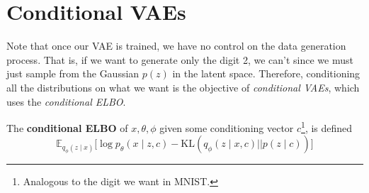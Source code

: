\section{Conditional VAEs}

  Note that once our VAE is trained, we have no control on the data generation process. That is, if we want to generate only the digit 2, we can't since we must just sample from the Gaussian $p(z)$ in the latent space. Therefore, conditioning all the distributions on what we want is the objective of \textit{conditional VAEs}, which uses the \textit{conditional ELBO}. 

  \begin{definition}
    \label{def:conditional-elbo}
    The \textbf{conditional ELBO} of $x, \theta, \phi$ given some conditioning vector $c$\footnote{Analogous to the digit we want in MNIST.}, is defined 
    \begin{equation}
      \mathbb{E}_{q_\phi(z \mid x)} \big[ \log p_\theta(x \mid z,c) - \mathrm{KL}(q_\phi (z \mid x,c) || p(z \mid c)) \big] 
    \end{equation}
  \end{definition}

